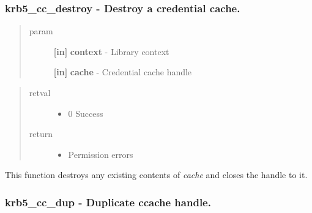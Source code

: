 \documentclass[letterpaper,10pt,english]{sphinxmanual}
\begin{document}
\subsubsection{krb5\_cc\_destroy -  Destroy a credential cache.}
\label{appdev/refs/api/krb5_cc_destroy:krb5-cc-destroy-destroy-a-credential-cache}\label{appdev/refs/api/krb5_cc_destroy::doc}

\begin{fulllineitems}
\label{appdev/refs/api/krb5_cc_destroy:c.krb5_cc_destroy}
\end{fulllineitems}

\begin{quote}\begin{description}
\item[{param}] \leavevmode
\textbf{{[}in{]}} \textbf{context} - Library context

\textbf{{[}in{]}} \textbf{cache} - Credential cache handle

\end{description}\end{quote}
\begin{quote}\begin{description}
\item[{retval}] \leavevmode\begin{itemize}
\item {} 
0   Success

\end{itemize}

\item[{return}] \leavevmode\begin{itemize}
\item {} 
Permission errors

\end{itemize}

\end{description}\end{quote}

This function destroys any existing contents of \emph{cache} and closes the handle to it.


\subsubsection{krb5\_cc\_dup -  Duplicate ccache handle.}
\label{appdev/refs/api/krb5_cc_dup:krb5-cc-dup-duplicate-ccache-handle}\label{appdev/refs/api/krb5_cc_dup::doc}
\end{document}
